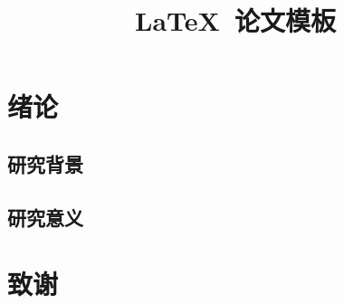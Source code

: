 \documentclass{swustthesis}
\title{\LaTeX\ 论文模板}
\begin{document}
\frontmatter
\tableofcontents

\mainmatter
\chapter{绪论}
\section{研究背景}
\section{研究意义}

\backmatter
\chapter{致谢}
\end{document}
